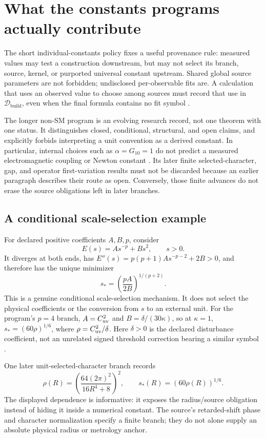 \documentclass[11pt]{article}
\newcommand{\Data}{\mathcal D}
\begin{document}
\section{What the constants programs actually contribute}
\label{sec:constants-programs}

The short individual-constants policy fixes a useful provenance rule:
measured values may test a construction downstream, but may not select its
branch, source, kernel, or purported universal constant upstream. Shared
global source parameters are not forbidden; undisclosed per-observable fits
are. A calculation that uses an observed value to choose among sources must
record that use in \(\Data_{\mathrm{build}}\), even when the final formula
contains no fit symbol \cite{FrozenIndividual}.

The longer non-SM program is an evolving research record, not one theorem
with one status. It distinguishes closed, conditional, structural, and open
claims, and explicitly forbids interpreting a unit convention as a derived
constant. In particular, internal choices such as \(\alpha=G_{10}=1\) do not
predict a measured electromagnetic coupling or Newton constant
\cite{FrozenNonSM}. Its later finite selected-character, gap, and operator
first-variation results must not be discarded because an earlier paragraph
describes their route as open. Conversely, those finite advances do not erase
the source obligations left in later branches.

\subsection{A conditional scale-selection example}
\label{sec:scale-example}

For declared positive coefficients \(A,B,p\), consider
\[
E(s)=A s^{-p}+B s^2,\qquad s>0.
\]
It diverges at both ends, has
\(E''(s)=p(p+1)A s^{-p-2}+2B>0\), and therefore has the unique minimizer
\[
s_\ast=\left(\frac{pA}{2B}\right)^{1/(p+2)}.
\]
This is a genuine conditional scale-selection mechanism. It does not select
the physical coefficients or the conversion from \(s\) to an external unit.
For the program's \(p=4\) branch, \(A=C_{\rm uv}^2\) and
\(B=\delta/(30\kappa)\), so at \(\kappa=1\),
\(s_\ast=(60\rho)^{1/6}\), where
\(\rho=C_{\rm uv}^2/\delta\). Here \(\delta>0\) is the declared disturbance
coefficient, not an unrelated signed threshold correction bearing a similar
symbol \cite{FrozenNonSM}.

One later unit-selected-character branch records
\[
\rho(R)=\left(\frac{64(2\pi)^2}{16R^4+8}\right)^2,
\qquad s_\ast(R)=(60\rho(R))^{1/6}.
\]
The displayed dependence is informative: it exposes the radius/source
obligation instead of hiding it inside a numerical constant. The source's
retarded-shift phase and character normalization specify a finite branch;
they do not alone supply an absolute physical radius or metrology anchor.
\end{document}
